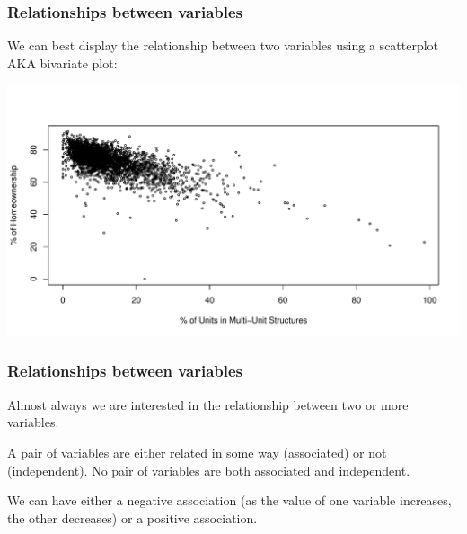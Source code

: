 \documentclass[handout]{beamer}
\newcommand{\blue}[1]{\textcolor{blue2}{#1}}
\begin{document}
\begin{frame}[fragile]
\frametitle{Relationships between variables}
We can best display the relationship between two variables using a \blue{scatterplot AKA bivariate plot}:

\begin{center}
\pause\includegraphics[width=\linewidth]{figure/relationships} 
\end{center}

\end{frame}


\begin{frame}
\frametitle{Relationships between variables}
Almost always we are interested in the relationship between two or more variables.

\vspace{0.25cm}

\pause A pair of variables are either related in some way (\blue{associated}) or not (\blue{independent}).  No pair of variables are both associated and independent.   

\vspace{0.25cm}

\pause We can have either a \blue{negative association} (as the value of one variable increases, the other decreases) or a \blue{positive association}.

\end{frame}
\end{document}
